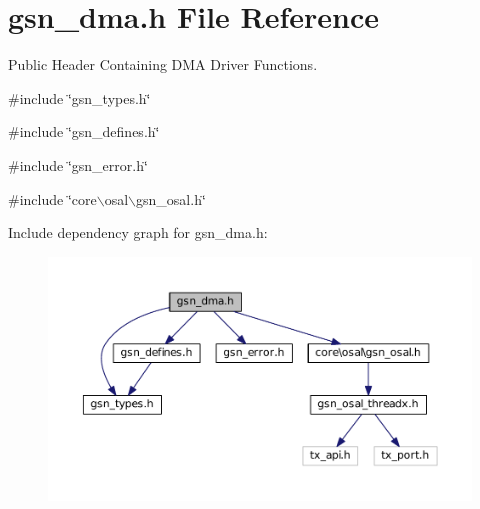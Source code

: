 \hypertarget{a00484}{
\section{gsn\_\-dma.h File Reference}
\label{a00484}
}


Public Header Containing DMA Driver Functions.  


{\ttfamily \#include \char`\"{}gsn\_\-types.h\char`\"{}}\par
{\ttfamily \#include \char`\"{}gsn\_\-defines.h\char`\"{}}\par
{\ttfamily \#include \char`\"{}gsn\_\-error.h\char`\"{}}\par
{\ttfamily \#include \char`\"{}core$\backslash$osal$\backslash$gsn\_\-osal.h\char`\"{}}\par
Include dependency graph for gsn\_\-dma.h:
\nopagebreak
\begin{figure}[H]
\begin{center}
\leavevmode
\includegraphics[width=400pt]{a00713}
\end{center}
\end{figure}
